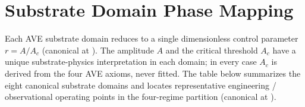 \section{Substrate Domain Phase Mapping}
\label{sec:vol9_phase_domain_mapping}

Each AVE substrate domain reduces to a single dimensionless control parameter $r = A/A_c$ (canonical at ). The amplitude $A$ and the critical threshold $A_c$ have a unique substrate-physics interpretation in each domain; in every case $A_c$ is derived from the four AVE axioms, never fitted. The table below summarizes the eight canonical substrate domains and locates representative engineering / observational operating points in the four-regime partition (canonical at ).

